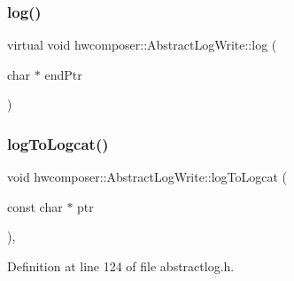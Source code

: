 \subsubsection{\texorpdfstring{log()}{log()}}
{\footnotesize\ttfamily virtual void hwcomposer\+::\+Abstract\+Log\+Write\+::log (\begin{DoxyParamCaption}\item[{char $\ast$}]{end\+Ptr }\end{DoxyParamCaption})\hspace{0.3cm}{\ttfamily [pure virtual]}}

\mbox{\label{classhwcomposer_1_1AbstractLogWrite_a854cb2e7bfd9f4b5a32235b057e24a6f}} 
\subsubsection{\texorpdfstring{log\+To\+Logcat()}{logToLogcat()}}
{\footnotesize\ttfamily void hwcomposer\+::\+Abstract\+Log\+Write\+::log\+To\+Logcat (\begin{DoxyParamCaption}\item[{const char $\ast$}]{ptr }\end{DoxyParamCaption})\hspace{0.3cm}{\ttfamily [inline]}, {\ttfamily [protected]}}



Definition at line 124 of file abstractlog.\+h.


